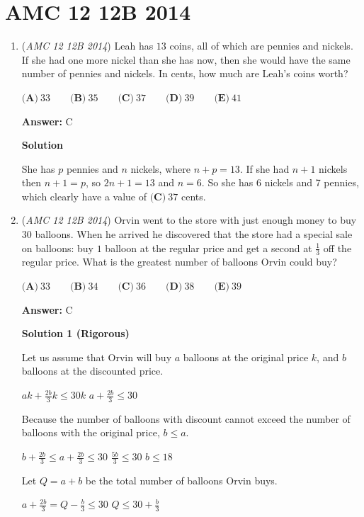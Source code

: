 \section{AMC 12 12B 2014}
        \begin{enumerate}
        	\item (\textit{AMC 12 12B 2014}) Leah has $13$ coins, all of which are pennies and nickels. If she had one more nickel than she has now, then she would have the same number of pennies and nickels. In cents, how much are Leah's coins worth?


 $\textbf{(A)}\ 33\qquad\textbf{(B)}\ 35\qquad\textbf{(C)}\ 37\qquad\textbf{(D)}\ 39\qquad\textbf{(E)}\ 41$

 \textbf{Answer: }C



\textbf{Solution}

She has $p$ pennies and $n$ nickels, where $n + p = 13$. If she had $n+1$ nickels then $n+1 = p$, so $2n+ 1 = 13$ and $n=6$. So she has 6 nickels and 7 pennies, which clearly have a value of $\boxed{\textbf{(C)}\ 37}$ cents.

 


	\item (\textit{AMC 12 12B 2014}) Orvin went to the store with just enough money to buy $30$ balloons. When he arrived he discovered that the store had a special sale on balloons: buy $1$ balloon at the regular price and get a second at $\frac{1}{3}$ off the regular price. What is the greatest number of balloons Orvin could buy?


 $\textbf{(A)}\ 33\qquad\textbf{(B)}\ 34\qquad\textbf{(C)}\ 36\qquad\textbf{(D)}\ 38\qquad\textbf{(E)}\ 39$

 \textbf{Answer: }C



\textbf{Solution 1 (Rigorous)}

Let us assume that Orvin will buy $a$ balloons at the original price $k$, and $b$ balloons at the discounted price.

 
$ak+\frac{2b}{3}k\leq{30k}$
$a+\frac{2b}{3}\leq{30}$

 
Because the number of balloons with discount cannot exceed the number of balloons with the original price, $b\leq{a}$.

 
$b+\frac{2b}{3}\leq a+\frac{2b}{3}\leq{30}$
$\frac{5b}{3}\leq{30}$
$b\leq{18}$

 
Let $Q=a+b$ be the total number of balloons Orvin buys.

 
$a+\frac{2b}{3}=Q-\frac{b}{3}\leq{30}$
$Q\leq{30+\frac{b}{3}}$


\end{enumerate}
